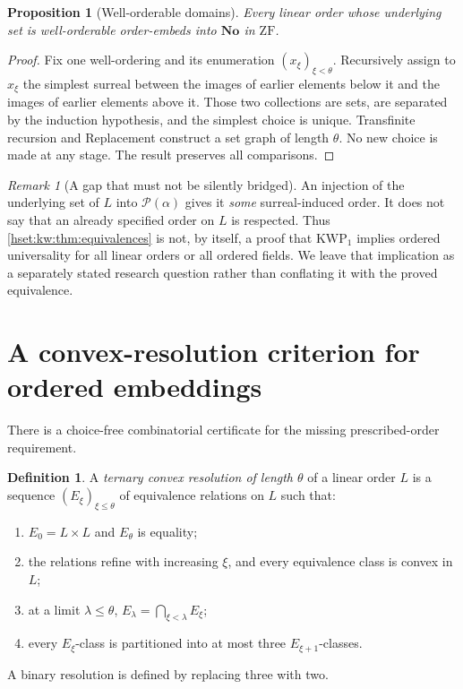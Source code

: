 \documentclass[11pt,letterpaper]{article}
\newtheorem{proposition}[proposition]{Proposition}\aliascntresetthe{proposition}
\theoremstyle{definition}
\newtheorem{definition}[definition]{Definition}\aliascntresetthe{definition}
\theoremstyle{remark}
\newtheorem{remark}[remark]{Remark}\aliascntresetthe{remark}
\newcommand{\No}{\mathbf{No}}
\newcommand{\Pow}{\mathcal P}
\newcommand{\ZF}{\mathrm{ZF}}
\newcommand{\KWP}{\mathrm{KWP}}
\begin{document}
\begin{proposition}[Well-orderable domains]\label{hset:kw:prop:wellordered}
Every linear order whose underlying set is well-orderable order-embeds into $\No$ in $\ZF$.
\end{proposition}
\begin{proof}
Fix one well-ordering and its enumeration $(x_\xi)_{\xi<\theta}$. Recursively assign to $x_\xi$ the simplest surreal between the images of earlier elements below it and the images of earlier elements above it. Those two collections are sets, are separated by the induction hypothesis, and the simplest choice is unique. Transfinite recursion and Replacement construct a set graph of length $\theta$. No new choice is made at any stage. The result preserves all comparisons.
\end{proof}

\begin{remark}[A gap that must not be silently bridged]
An injection of the underlying set of $L$ into $\Pow(\alpha)$ gives it \emph{some} surreal-induced order. It does not say that an already specified order on $L$ is respected. Thus \cref{hset:kw:thm:equivalences} is not, by itself, a proof that $\KWP_1$ implies ordered universality for all linear orders or all ordered fields. We leave that implication as a separately stated research question rather than conflating it with the proved equivalence.
\end{remark}

\section{A convex-resolution criterion for ordered embeddings}
\label{hset:kw:sec:resolutions}

There is a choice-free combinatorial certificate for the missing prescribed-order requirement.

\begin{definition}
A \emph{ternary convex resolution of length $\theta$} of a linear order $L$ is a sequence $(E_\xi)_{\xi\le\theta}$ of equivalence relations on $L$ such that:
\begin{enumerate}[label=(\alph*)]
\item $E_0=L\times L$ and $E_\theta$ is equality;
\item the relations refine with increasing $\xi$, and every equivalence class is convex in $L$;
\item at a limit $\lambda\le\theta$, $E_\lambda=\bigcap_{\xi<\lambda}E_\xi$;
\item every $E_\xi$-class is partitioned into at most three $E_{\xi+1}$-classes.
\end{enumerate}
A binary resolution is defined by replacing three with two.
\end{definition}
\end{document}
